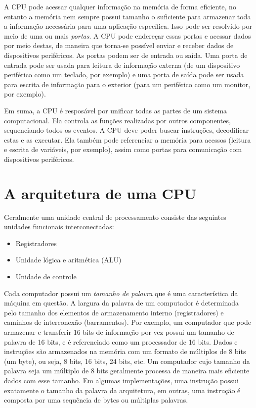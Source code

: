 \documentclass[11pt,a4paper]{report}
\begin{document}
A CPU pode acessar qualquer informação na memória de forma eficiente, no
entanto a memória nem sempre possui tamanho o suficiente para armazenar
toda a informação necessária para uma aplicação específica. Isso pode ser
resolvido por meio de uma ou mais \textit{portas}. A CPU pode endereçar
essas portas e acessar dados por meio destas, de maneira que torna-se
possível enviar e receber dados de dispositivos periféricos. As portas
podem ser de entrada ou saída. Uma porta de entrada pode ser usada para
leitura de informação externa (de um dispositivo periférico como um
teclado, por exemplo) e uma porta de saída pode ser usada para escrita
de informação para o exterior (para um periférico como um monitor, por
exemplo).

Em suma, a CPU é resposável por unificar todas as partes de um sistema
computacional. Ela controla as funções realizadas por outros componentes,
sequenciando todos os eventos. A CPU deve poder buscar instruções,
decodificar estas e as executar. Ela também pode referenciar a memória
para acessos (leitura e escrita de variáveis, por exemplo), assim como
portas para comunicação com dispositivos periféricos.

\section{A arquitetura de uma CPU}

Geralmente uma unidade central de processamento consiste das seguintes
unidades funcionais interconectadas:

\begin{itemize}
\item Registradores
\item Unidade lógica e aritmética (ALU)
\item Unidade de controle
\end{itemize}

Cada computador possui um \textit{tamanho de palavra} que é uma
característica da máquina em questão. A largura da palavra de um
computador é determinada pelo tamanho dos elementos de armazenamento
interno (registradores) e caminhos de interconexão (barramentos).
Por exemplo, um computador que pode armazenar e transferir 16 bits de
informação por vez possui um tamanho de palavra de 16 bits, e é 
referenciado como um processador de 16 bits. Dados e instruções são
armazenados na memória com um formato de múltiplos de 8 bits (um byte),
ou seja, 8 bits, 16 bits, 24 bits, etc. Um computador cujo tamanho da
palavra seja um múltiplo de 8 bits geralmente processa de maneira mais
eficiente dados com esse tamanho. Em algumas implementações, uma
instrução possui exatamente o tamanho da palavra da arquitetura, em
outras, uma instrução é composta por uma sequência de bytes ou múltiplas
palavras.
\end{document}
